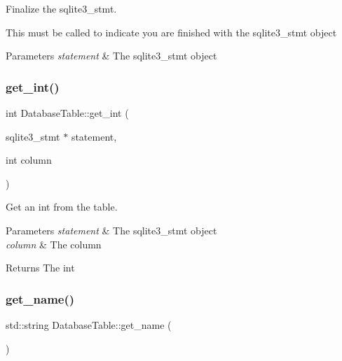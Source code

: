Finalize the sqlite3\+\_\+stmt. 

This must be called to indicate you are finished with the sqlite3\+\_\+stmt object


\begin{DoxyParams}{Parameters}
{\em statement} & The sqlite3\+\_\+stmt object \\
\hline
\end{DoxyParams}
\mbox{\label{class_database_table_ae57f4efec8565b48646579e5459a9077}} 
\subsubsection{\texorpdfstring{get\+\_\+int()}{get\_int()}}
{\footnotesize\ttfamily int Database\+Table\+::get\+\_\+int (\begin{DoxyParamCaption}\item[{sqlite3\+\_\+stmt $\ast$}]{statement,  }\item[{int}]{column }\end{DoxyParamCaption})}



Get an int from the table. 


\begin{DoxyParams}{Parameters}
{\em statement} & The sqlite3\+\_\+stmt object \\
\hline
{\em column} & The column \\
\hline
\end{DoxyParams}
\begin{DoxyReturn}{Returns}
The int 
\end{DoxyReturn}
\mbox{\label{class_database_table_aaca8178d392b95d67245e61e2d3630a9}} 
\subsubsection{\texorpdfstring{get\+\_\+name()}{get\_name()}}
{\footnotesize\ttfamily std\+::string Database\+Table\+::get\+\_\+name (\begin{DoxyParamCaption}{ }\end{DoxyParamCaption})}



